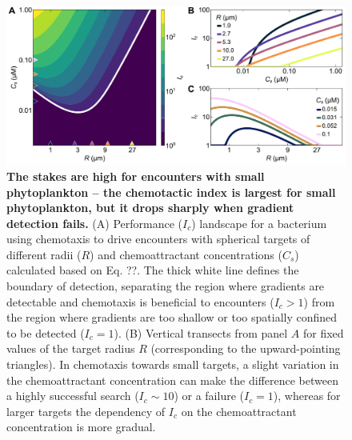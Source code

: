 \documentclass[9pt,twocolumn,twoside]{pnas-new}
\begin{document}
\begin{figure}
    \centering
    \includegraphics[width=17.8cm]{fig3_mod.pdf}
    \caption{
        \textbf{
        The stakes are high for encounters with small phytoplankton -- the chemotactic index is largest for small phytoplankton, but it drops sharply when gradient detection fails.
        }
        (A) Performance ($I_c$) landscape for a bacterium using chemotaxis to drive encounters with spherical targets of different radii ($R$) and chemoattractant concentrations ($C_s$) calculated based on Eq. ??.
        The thick white line defines the boundary of detection, separating the region where gradients are detectable and chemotaxis is beneficial to encounters ($I_c > 1$) from the region where gradients are too shallow or too spatially confined to be detected ($I_c = 1$).
        (B) Vertical transects from panel $A$ for fixed values of the target radius $R$ (corresponding to the upward-pointing triangles).
        In chemotaxis towards small targets, a slight variation in the chemoattractant concentration can make the difference between a highly successful search ($I_c\sim10$) or a failure ($I_c=1$), whereas for larger targets the dependency of $I_c$ on the chemoattractant concentration is more gradual.
}
\end{figure}
\end{document}
